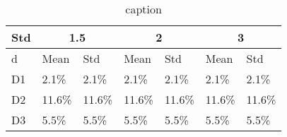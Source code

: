 \begin{table}[!h]
  \centering

  \caption{caption}
  \label{tab:table}
\begin{tabular}{|l|l|l|l|l|l|l|}
    \hline
   \multicolumn{1}{|c|}{Std} &
      \multicolumn{2}{c|}{1.5} &
      \multicolumn{2}{c|}{2} &
      \multicolumn{2}{c|}{3} \\
      \hline
    d& Mean & Std & Mean & Std & Mean & Std \\
    \hline
    D1 & 2.1\% & 2.1\% & 2.1\% & 2.1\% & 2.1\% & 2.1\% \\
    \hline
    D2 & 11.6\% & 11.6\% & 11.6\% & 11.6\% & 11.6\% & 11.6\% \\
    \hline
    D3 & 5.5\% & 5.5\% & 5.5\% & 5.5\% & 5.5\% & 5.5\% \\
    \hline
  \end{tabular}

\end{table}


